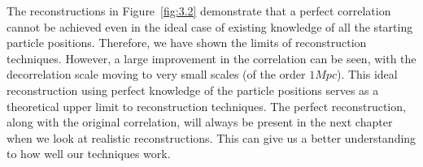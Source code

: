 The reconstructions in Figure~\ref{fig:3.2} demonstrate that a perfect correlation cannot be achieved even in the ideal case of existing knowledge of all the starting particle positions. Therefore, we have shown the limits of reconstruction techniques. However, a large improvement in the correlation can be seen, with the decorrelation scale moving to very small scales (of the order $1 Mpc$). This ideal reconstruction using perfect knowledge of the particle positions serves as a theoretical upper limit to reconstruction techniques. The perfect reconstruction, along with the original correlation, will always be present in the next chapter when we look at realistic reconstructions. This can give us a better understanding to how well our techniques work.


